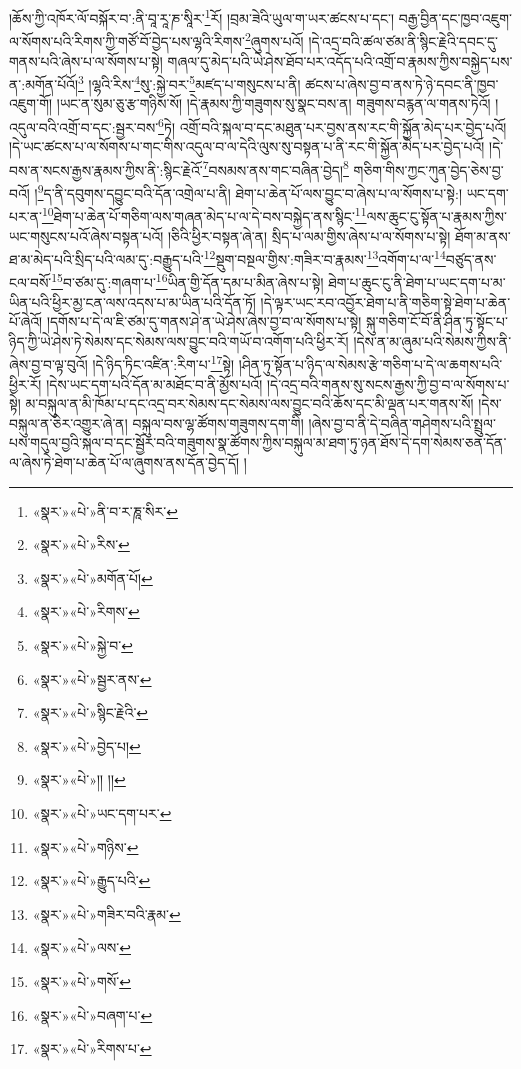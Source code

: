 །ཆོས་ཀྱི་འཁོར་ལོ་བསྐོར་བ་:ནི་བཱ་རཱ་ཎ་སཱིར་\footnote{«སྣར་»«པེ་»ནི་བ་ར་ཎཱ་སིར་}རོ། །བྲམ་ཟེའི་ཡུལ་ག་ཡར་ཚངས་པ་དང་། བརྒྱ་བྱིན་དང་ཁྱབ་འཇུག་ལ་སོགས་པའི་རིགས་ཀྱི་གཙོ་བོ་བྱེད་པས་ལྷའི་རིགས་\footnote{«སྣར་»«པེ་»རིས་}ཞུགས་པའོ། །དེ་འདྲ་བའི་ཚལ་ཙམ་ནི་སྙིང་རྗེའི་དབང་དུ་གནས་པའི་ཞེས་པ་ལ་སོགས་པ་སྟེ། གཞལ་དུ་མེད་པའི་ཡེ་ཤེས་ཐོབ་པར་འདོད་པའི་འགྲོ་བ་རྣམས་ཀྱིས་བསྐྱེད་པས་ན་:མགོན་པོའོ།\footnote{«སྣར་»«པེ་»མགོན་པོ།} །ལྷའི་རིས་\footnote{«སྣར་»«པེ་»རིགས་}སུ་:སྐྱེ་བར་\footnote{«སྣར་»«པེ་»སྐྱེ་བ་}མཛད་པ་གསུངས་པ་ནི། ཚངས་པ་ཞེས་བྱ་བ་ནས་ཏེ་ཉེ་དབང་ནི་ཁྱབ་འཇུག་གོ། །ཡང་ན་སུམ་ཅུ་རྩ་གཉིས་སོ། །དེ་རྣམས་ཀྱི་གཟུགས་སུ་སྣང་བས་ན། གཟུགས་བརྙན་ལ་གནས་ཏེའོ། །འདུལ་བའི་འགྲོ་བ་དང་:སྦྱར་བས་\footnote{«སྣར་»«པེ་»སྦྱར་ནས་}ཏེ། འགྲོ་བའི་སྐལ་བ་དང་མཐུན་པར་བྱས་ནས་རང་གི་སྐྱོན་མེད་པར་བྱེད་པའོ། །དེ་ཡང་ཚངས་པ་ལ་སོགས་པ་གང་གིས་འདུལ་བ་ལ་དེའི་ལུས་སུ་བསྟན་པ་ནི་རང་གི་སྐྱོན་མེད་པར་བྱེད་པའོ། །དེ་བས་ན་སངས་རྒྱས་རྣམས་ཀྱིས་ནི་:སྙིང་རྗེའོ་\footnote{«སྣར་»«པེ་»སྙིང་རྗེའི་}བསམས་ནས་གང་བཞིན་བྱེད།\footnote{«སྣར་»«པེ་»བྱེད་པ།} གཅིག་གིས་ཀྱང་ཀུན་བྱེད་ཅེས་བྱ་བའོ། །\footnote{«སྣར་»«པེ་»།། །།}ད་ནི་དབུགས་དབྱུང་བའི་དོན་འགྲེལ་པ་ནི། ཐེག་པ་ཆེན་པོ་ལས་བྱུང་བ་ཞེས་པ་ལ་སོགས་པ་སྟེ:། ཡང་དག་པར་ན་\footnote{«སྣར་»«པེ་»ཡང་དག་པར་}ཐེག་པ་ཆེན་པོ་གཅིག་ལས་གཞན་མེད་པ་ལ་དེ་བས་བསྐྱེད་ནས་སྙིང་\footnote{«སྣར་»«པེ་»གཉིས་}ལས་ཆུང་ངུ་སྟོན་པ་རྣམས་ཀྱིས་ཡང་གསུངས་པའོ་ཞེས་བསྟན་པའོ། །ཅིའི་ཕྱིར་བསྟན་ཞེ་ན། སྲིད་པ་ལམ་གྱིས་ཞེས་པ་ལ་སོགས་པ་སྟེ། ཐོག་མ་ནས་ཐ་མ་མེད་པའི་སྲིད་པའི་ལམ་དུ་:བརྒྱུད་པའི་\footnote{«སྣར་»«པེ་»རྒྱུད་པའི་}སྡུག་བསྔལ་གྱིས་:གཟིར་བ་རྣམས་\footnote{«སྣར་»«པེ་»གཟིར་བའི་རྣམ་}འགོག་པ་ལ་\footnote{«སྣར་»«པེ་»ལས་}བཙུད་ནས་ངལ་བསོ་\footnote{«སྣར་»«པེ་»གསོ་}བ་ཙམ་དུ་:གཞག་པ་\footnote{«སྣར་»«པེ་»བཞག་པ་}ཡིན་གྱི་དོན་དམ་པ་མིན་ཞེས་པ་སྟེ། ཐེག་པ་ཆུང་ངུ་ནི་ཐེག་པ་ཡང་དག་པ་མ་ཡིན་པའི་ཕྱིར་མྱ་ངན་ལས་འདས་པ་མ་ཡིན་པའི་དོན་ཏོ། །དེ་ལྟར་ཡང་རབ་འབྱོར་ཐེག་པ་ནི་གཅིག་སྟེ་ཐེག་པ་ཆེན་པོ་ཞེའོ། །དགོས་པ་དེ་ལ་ཇི་ཙམ་དུ་གནས་ཤེ་ན་ཡེ་ཤེས་ཞེས་བྱ་བ་ལ་སོགས་པ་སྟེ། སྐུ་གཅིག་ངོ་བོ་ནི་ཤིན་ཏུ་སྟོང་པ་ཉིད་ཀྱི་ཡེ་ཤེས་ཏེ་སེམས་དང་སེམས་ལས་བྱུང་བའི་གཡོ་བ་འགོག་པའི་ཕྱིར་རོ། །དེས་ན་མ་ཞུམ་པའི་སེམས་ཀྱིས་ནི་ཞེས་བྱ་བ་ལྟ་བུའོ། །དེ་ཉིད་ཏིང་འཛིན་:རིག་པ་\footnote{«སྣར་»«པེ་»རིགས་པ་}སྟེ། །ཤིན་ཏུ་སྟོན་པ་ཉིད་ལ་སེམས་རྩེ་གཅིག་པ་དེ་ལ་ཆགས་པའི་ཕྱིར་རོ། །དེས་ཡང་དག་པའི་དོན་མ་མཐོང་བ་ནི་མྱོས་པའོ། །དེ་འདྲ་བའི་གནས་སུ་སངས་རྒྱས་ཀྱི་བྱ་བ་ལ་སོགས་པ་སྟེ། མ་བསྐུལ་ན་མི་ཁོམ་པ་དང་འདྲ་བར་སེམས་དང་སེམས་ལས་བྱུང་བའི་ཆོས་དང་མི་ལྡན་པར་གནས་སོ། །དེས་བསྐུལ་ན་ཅིར་འགྱུར་ཞེ་ན། བསྐུལ་བས་ལྷ་ཚོགས་གཟུགས་དག་གི། །ཞེས་བྱ་བ་ནི་དེ་བཞིན་གཤེགས་པའི་སྤྲུལ་པས་གདུལ་བྱའི་སྐལ་བ་དང་སྦྱོར་བའི་གཟུགས་སྣ་ཚོགས་ཀྱིས་བསྐུལ་མ་ཐག་ཏུ་ཉན་ཐོས་དེ་དག་སེམས་ཅན་དོན་ལ་ཞེས་ཏེ་ཐེག་པ་ཆེན་པོ་ལ་ཞུགས་ནས་དོན་བྱེད་དོ། །
